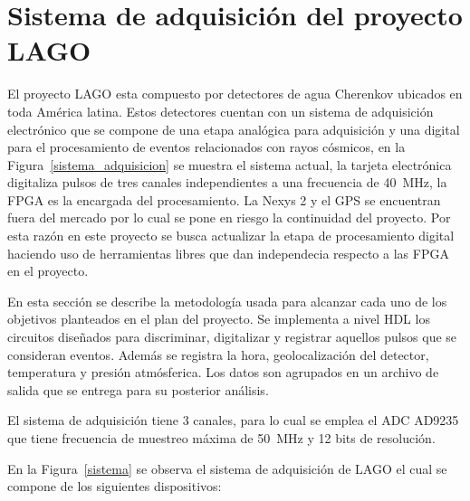 \chapter{Sistema de adquisición del proyecto LAGO}
El proyecto LAGO esta compuesto por detectores de agua Cherenkov  ubicados en toda América latina. Estos detectores cuentan  con un sistema de adquisición electrónico que se compone de una etapa analógica para adquisición y una digital para el procesamiento de eventos relacionados con rayos cósmicos, en la Figura~\ref{sistema_adquisicion} se muestra el sistema actual, la tarjeta electrónica digitaliza pulsos de tres canales independientes a una frecuencia de 40~MHz, la FPGA es la encargada del procesamiento. La Nexys 2 y el GPS se encuentran fuera del mercado por lo cual se pone en riesgo la continuidad del proyecto. Por esta razón en este proyecto se busca actualizar la etapa de procesamiento digital haciendo uso de herramientas libres que dan independecia respecto a las FPGA en el proyecto.


En esta sección se describe la metodología usada para alcanzar cada uno de los objetivos planteados en el plan del proyecto.
Se implementa a nivel HDL los circuitos diseñados para discriminar, digitalizar y registrar aquellos pulsos que se consideran eventos.
Además se registra la hora, geolocalización del detector, temperatura y presión atmósferica. Los datos son agrupados en un archivo de salida que se entrega para su posterior análisis.

El sistema de adquisición tiene 3 canales, para lo cual se emplea el ADC AD9235 que tiene frecuencia de muestreo máxima de 50~MHz y 12 bits de resolución.

En la Figura~\ref{sistema} se observa el sistema de adquisición de LAGO el cual se compone de los siguientes dispositivos: 

